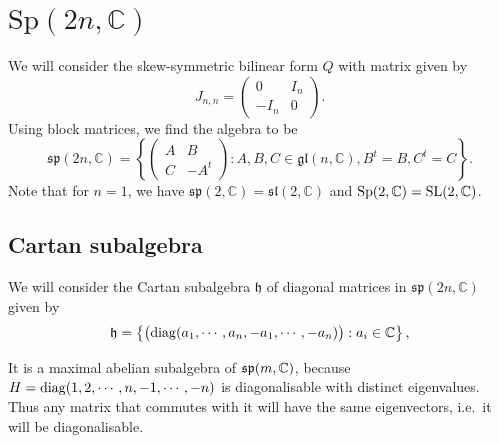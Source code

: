 \documentclass{report}
\begin{document}
\section{$\mathrm{Sp}(2n, \mathbb C)$}
We will consider the skew-symmetric bilinear form $Q$ with matrix given by
\[
J_{n,n} = \begin{pmatrix}
    0 & I_n\\
    -I_n & 0
\end{pmatrix}.
\]
Using block matrices, we find the algebra to be
\[
\mathfrak{sp}(2n, \mathbb C) = \left\{ \begin{pmatrix}
    A & B\\
    C & -A^t
\end{pmatrix}: A, B,C \in \mathfrak{gl}(n, \mathbb C), B^t = B, C^t = C
\right\}.
\]
Note that for $n = 1$, we have $\mathfrak{sp}(2, \mathbb C) = \mathfrak{sl}(2, \mathbb C)$ and $\operatorname{{\mathrm{Sp}}}(2, \mathbb C) = \operatorname{{\mathrm{SL}}}(2, \mathbb C)$.


\subsection{Cartan subalgebra}
We will consider the Cartan subalgebra $\mathfrak h$ of diagonal matrices in $\mathfrak{sp}(2n, \mathbb C)$ given by
\[
\mathfrak h = \left\{
    \begin{pmatrix}
        \operatorname{diag}(a_1,\cdots, a_n, -a_1,\cdots, -a_n)
    \end{pmatrix} : a_i \in \mathbb{C}    
\right\},
\]

It is a maximal abelian subalgebra of $\operatorname{{\mathfrak{sp}}}(m, \mathbb C)$, because $H = \operatorname{diag}(1, 2, \cdots, n, -1, \cdots, -n)$ is diagonalisable with distinct eigenvalues.
Thus any matrix that commutes with it will have the same eigenvectors, i.e.\ it will be diagonalisable.
\end{document}
